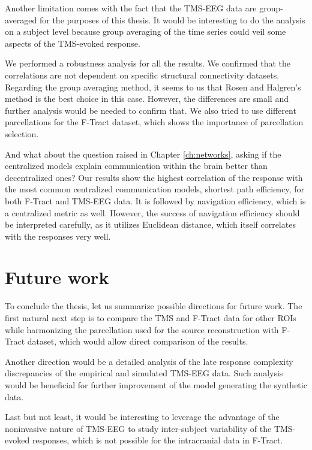 Another limitation comes with the fact that the TMS-EEG data are group-averaged for the purposes of this thesis. It would be interesting to do the analysis on a subject level because group averaging of the time series could veil some aspects of the TMS-evoked response.

We performed a robustness analysis for all the results. We confirmed that the correlations are not dependent on specific structural connectivity datasets. Regarding the group averaging method, it seems to us that Rosen and Halgren's method is the best choice in this case. However, the differences are small and further analysis would be needed to confirm that. We also tried to use different parcellations for the F-Tract dataset, which shows the importance of parcellation selection.

And what about the question raised in Chapter \ref{ch:networks}, asking if the centralized models explain communication within the brain better than decentralized ones? Our results show the highest correlation of the response with the most common centralized communication models, shortest path efficiency, for both F-Tract and TMS-EEG data. It is followed by navigation efficiency, which is a centralized metric as well. However, the success of navigation efficiency should be interpreted carefully, as it utilizes Euclidean distance, which itself correlates with the responses very well.

\section*{Future work}

To conclude the thesis, let us summarize possible directions for future work. The first natural next step is to compare the TMS and F-Tract data for other ROIs while harmonizing the parcellation used for the source reconstruction with F-Tract dataset, which would allow direct comparison of the results.

Another direction would be a detailed analysis of the late response complexity discrepancies of the empirical and simulated TMS-EEG data. Such analysis would be beneficial for further improvement of the model generating the synthetic data.

Last but not least, it would be interesting to leverage the advantage of the noninvasive nature of TMS-EEG to study inter-subject variability of the TMS-evoked responses, which is not possible for the intracranial data in F-Tract.